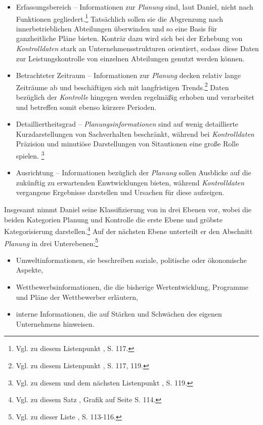 \begin{itemize}\itemsep0pt
\item[1.]Erfassungsbereich -- Informationen zur \textit{Planung} sind, laut Daniel, nicht nach Funktionen gegliedert.\footnote{Vgl. zu diesem Listenpunkt \cite{Daniel.1961}, S. 117.} Tatsächlich sollen sie die Abgrenzung nach 
innerbetrieblichen Abteilungen überwinden und so eine Basis für ganzheitliche Pläne bieten. Konträr dazu wird sich bei der Erhebung 
von \textit{Kontrolldaten} stark an Unternehmensstrukturen orientiert, sodass diese Daten zur Leistungskontrolle von einzelnen Abteilungen genutzt werden können.
\item[2.]Betrachteter Zeitraum -- Informationen zur \textit{Planung} decken relativ lange Zeiträume ab und beschäftigen sich mit langfristigen Trends.\footnote{Vgl. zu diesem Listenpunkt \cite{Daniel.1961}, S. 117, 119.} 
Daten bezüglich der \textit{Kontrolle} hingegen werden regelmäßig erhoben und verarbeitet und betreffen somit ebenso kürzere Perioden.
\item[3.]Detailliertheitsgrad -- \textit{Planungsinformationen} sind auf wenig detaillierte Kurzdarstellungen von Sachverhalten beschränkt, während bei
\textit{Kontrolldaten} Präzision und minutiöse Darstellungen von Sitautionen eine große Rolle spielen. \footnote{Vgl. zu diesem und dem nächsten Listenpunkt \cite{Daniel.1961}, S. 119.}
\item[4.]Ausrichtung -- Informationen bezüglich der \textit{Planung} sollen Ausblicke auf die zukünftig zu erwartenden Enwtwicklungen bieten, während 
\textit{Kontrolldaten} vergangene Ergebnisse darstellen und Ursachen für diese aufzeigen. 
\end{itemize}
\noindent
Insgesamt nimmt Daniel seine Klassifizierung von \EF in drei Ebenen vor, wobei die beiden Kategorien Planung und Kontrolle die 
erste Ebene und gröbste Kategorisierung darstellen.\footnote{Vgl. zu diesem Satz \cite{Daniel.1961}, Grafik auf Seite S. 114.} 
Auf der nächsten Ebene unterteilt er den Abschnitt \textit{Planung} in drei Unterebenen:\footnote{Vgl. zu dieser Liste \cite{Daniel.1961}, S. 113-116.}
\begin{itemize}\itemsep0pt
\item[-]Umweltinformationen, sie beschreiben soziale, politische oder ökonomische Aspekte,
\item[-]Wettbewerbsinformationen, die die bisherige Wertentwicklung, Programme und Pläne der Wettbewerber erläutern,
\item[-]{interne Informationen, die auf Stärken und Schwächen des eigenen Unternehmens hinweisen.}
\end{itemize}
